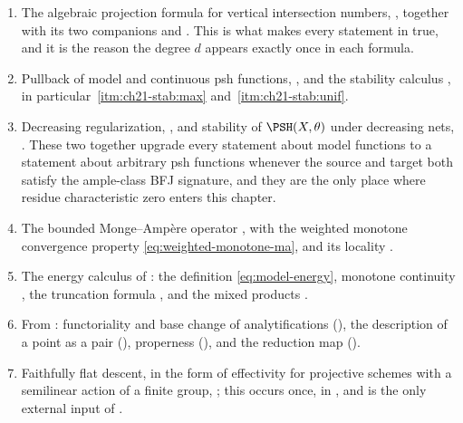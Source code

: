 \begin{enumerate}
\item\label{itm:ch30-import:projection}
The algebraic projection formula for vertical intersection numbers,
, together with its two companions
 and .  This
is what makes every statement in
 true, and it is the reason the
degree \(d\) appears exactly once in each formula.

\item\label{itm:ch30-import:pullback}
Pullback of model and continuous psh functions,
, and the stability calculus
, in particular
\,\cref{itm:ch21-stab:max} and
\,\cref{itm:ch21-stab:unif}.

\item\label{itm:ch30-import:regularization}
Decreasing regularization, , and
stability of \(\PSH(X,\theta)\) under decreasing nets,
.  These two together upgrade every
statement about model functions to a statement about arbitrary psh
functions whenever the source and target both satisfy the ample-class BFJ
signature, and they are the only place where residue characteristic zero
enters this chapter.

\item\label{itm:ch30-import:ma}
The bounded Monge--Amp\`ere operator ,
with the weighted monotone convergence property
\eqref{eq:weighted-monotone-ma}, and its locality
.

\item\label{itm:ch30-import:energy}
The energy calculus of : the definition
\eqref{eq:model-energy}, monotone continuity
, the truncation formula
, and the mixed products
.

\item\label{itm:ch30-import:analytic}
From : functoriality and base change of
analytifications (), the description of a point
as a pair (), properness
(), and the reduction map
().

\item\label{itm:ch30-import:descent}
Faithfully flat descent, in the form of effectivity for projective schemes
with a semilinear action of a finite group, \cite[Exp.~VIII]{SGA1}; this
occurs once, in , and is the only external
input of .
\end{enumerate}

